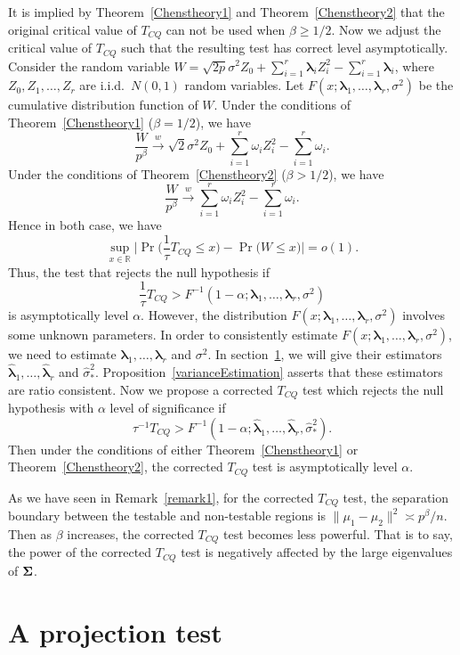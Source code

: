 \documentclass[review]{elsarticle}
\newcommand{\bfsym}[1]{\ensuremath{\boldsymbol{#1}}}
\def\blambda {\bfsym {\lambda}}        \def\bLambda {\bfsym {\Lambda}}
\theoremstyle{plain}
\theoremstyle{definition}
\theoremstyle{remark}
\begin{document}
It is implied by Theorem~\ref{Chenstheory1} and Theorem~\ref{Chenstheory2} that the original critical value of $T_{CQ}$ can not be used when $\beta\geq 1/2$.
Now we adjust the critical value of $T_{CQ}$ such that the resulting test has correct level asymptotically.
Consider the random variable
$
W=
\sqrt{2p}\sigma^2 Z_0
+
        \sum_{i=1}^r \blambda_i Z_i^2
            -
        \sum_{i=1}^r \blambda_i
        $, 
where $Z_0,Z_1,\ldots,Z_r$ are i.i.d.\ $N(0,1)$ random variables.
Let $F(x;\blambda_1,\ldots,\blambda_r,\sigma^2)$ be the cumulative distribution function of $W$.
Under the conditions of Theorem~\ref{Chenstheory1} ($\beta=1/2$), we have
$$
\frac{W}{p^{\beta}}\xrightarrow{w}
\sqrt{2}\sigma^2 Z_0 + \sum_{i=1}^r \omega_i Z_i^2 -\sum_{i=1}^r \omega_i.
$$
Under the conditions of Theorem~\ref{Chenstheory2} ($\beta>1/2$), we have
$$
\frac{W}{p^{\beta}}\xrightarrow{w}
\sum_{i=1}^r \omega_i Z_i^2 -\sum_{i=1}^r \omega_i.
$$
Hence in both case, we have
$$
\sup_{x\in\mathbb{R}}\big|\Pr\big(\frac{1}{\tau}T_{CQ}\leq x\big)-\Pr\big(W\leq x\big)\big|
=o(1).
$$
Thus, the test that rejects the null hypothesis if
$$
\frac{1}{\tau}T_{CQ}>
F^{-1}(1-\alpha;\blambda_1,\ldots,\blambda_r,\sigma^2)
$$
is asymptotically level $\alpha$.
        However, the distribution $F(x;\blambda_1,\ldots,\blambda_r,\sigma^2)$ involves some unknown parameters.
In order to consistently estimate $F(x;\blambda_1,\ldots,\blambda_r,\sigma^2)$, we need to estimate $\blambda_1,\ldots,\blambda_r$ and $\sigma^2$.
In section~\ref{methodology}, we will give their estimators $\hat{\blambda}_1,\ldots,\hat{\blambda}_r$ and $\hat{\sigma}_{*}^2$. 
Proposition~\ref{varianceEstimation} asserts that these estimators are ratio consistent. 
Now we propose a corrected $T_{CQ}$ test which rejects the null hypothesis with $\alpha$ level of significance if
$$
\tau^{-1}{T_{CQ}}> F^{-1}(1-\alpha;\hat{\blambda}_1,\ldots,\hat{\blambda}_r,\hat{\sigma}_*^2).
$$
Then under the conditions of either Theorem~\ref{Chenstheory1} or Theorem~\ref{Chenstheory2}, the corrected $T_{CQ}$ test is asymptotically level $\alpha$.

As we have seen in Remark~\ref{remark1}, for the corrected $T_{CQ}$ test, the separation boundary between the testable and non-testable regions  is $\|\mu_1-\mu_2\|^2\asymp p^{\beta}/n$.
Then as $\beta$ increases, the corrected $T_{CQ}$ test becomes less powerful.
That is to say, the power of the corrected $T_{CQ}$ test is negatively affected by the large eigenvalues of $\bSigma$.


\section{A projection test}\label{methodology}
\end{document}
